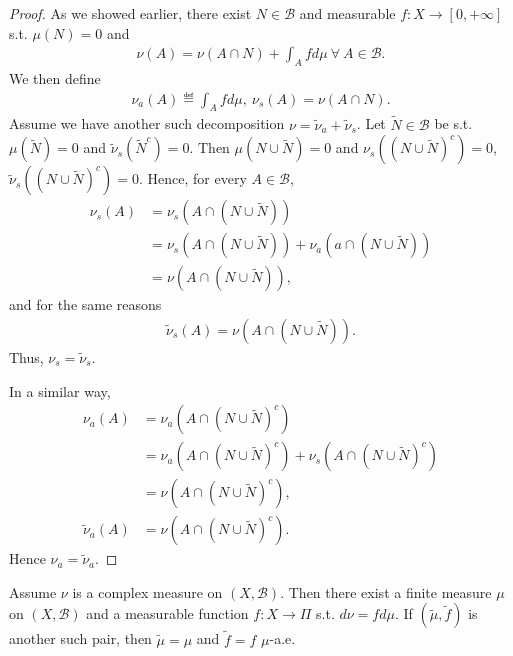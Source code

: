 \begin{proof}
    As we showed earlier, there exist \(N\in\mathscr{B}\) and measurable \(f:X\rightarrow[0,+\infty]\) s.t. \(\mu(N)=0\) and 
    \begin{align*}
        \nu(A) = \nu(A\cap N) + \int_A fd\mu \ \forall \ A\in\mathscr{B}.
    \end{align*}
    We then define
    \begin{align*}
        \nu_a(A)\eqdef \int_A fd\mu, \ \nu_s(A) = \nu(A\cap N).
    \end{align*} 
    Assume we have another such decomposition \(\nu = \tilde{\nu}_a + \tilde{\nu}_s\). Let \(\tilde{N}\in\mathscr{B}\) be s.t. \(\mu(\tilde{N})=0\) and \(\tilde{\nu}_s(\tilde{N}^c)=0\). Then \(\mu(N\cup\tilde{N})=0\) and \(\nu_s((N\cup\tilde{N})^c)=0\), \(\tilde{\nu}_s((N\cup\tilde{N})^c)=0\). Hence, for every \(A\in\mathscr{B}\), 
    \begin{align*}
        \nu_s(A) &= \nu_s\left(A\cap\left(N\cup\tilde{N}\right)\right) \\ 
        &= \nu_s\left(A\cap\left(N\cup\tilde{N}\right)\right) + \nu_a\left(a\cap\left(N\cup\tilde{N}\right)\right) \\
        &= \nu\left(A\cap\left(N\cup\tilde{N}\right)\right),
    \end{align*}
    and for the same reasons
    \begin{align*}
        \tilde{\nu}_s(A) = \nu\left(A\cap\left(N\cup\tilde{N}\right)\right).
    \end{align*}
    Thus, \(\nu_s=\tilde{\nu}_s\). 

    In a similar way,
    \begin{align*}
        \nu_a(A) &= \nu_a\left(A\cap\left(N\cup\tilde{N}\right)^c\right) \\
        &= \nu_a\left(A\cap\left(N\cup\tilde{N}\right)^c\right) + \nu_s\left(A\cap\left(N\cup\tilde{N}\right)^c\right) \\
        &= \nu\left(A\cap\left(N\cup\tilde{N}\right)^c\right), \\
        \tilde{\nu}_a(A) &= \nu\left(A\cap\left(N\cup\tilde{N}\right)^c\right).
    \end{align*}
    Hence \(\nu_a = \tilde{\nu}_a\).
\end{proof}
\fi
\begin{theorem}
    Assume \(\nu\) is a complex measure on \((X,\mathscr{B})\). Then there exist a finite measure \(\mu\) on \((X,\mathscr{B})\) and a measurable function \(f:X\rightarrow \Pi\) s.t. \(d\nu=fd\mu\). If \((\tilde{\mu},\tilde{f})\) is another such pair, then \(\tilde{\mu}=\mu\) and \(\tilde{f}=f\)  \(\mu\)-a.e.
\end{theorem}
